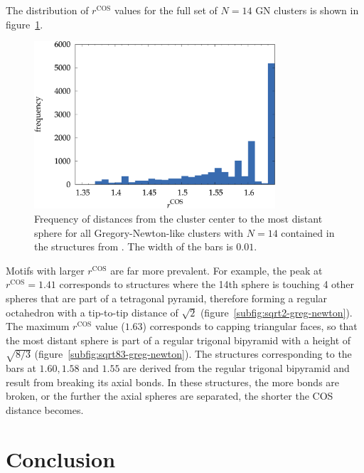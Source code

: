 The distribution of $r^\text{COS}$ values for the full set of $N=14$ \ac{GN}
clusters is shown in figure~\ref{fig:greg-newton}.
%
\begin{figure}
    \centering
    \includegraphics[width=0.8\textwidth]{gregory-newton/greg-newton.pdf}
    \caption{Frequency of distances from the cluster center to the most distant
    sphere for all Gregory-Newton-like clusters with $N=14$ contained in the
    structures from
    \citeauthor{Holmes-Cerfon_EnumeratingRigidSphere_2016}\autocite{Holmes-Cerfon_EnumeratingRigidSphere_2016}.
    The width of the bars is $0.01$.}
    \label{fig:greg-newton}
\end{figure}
%
Motifs with larger $r^\text{COS}$ are far more prevalent. For example, the peak
at $r^\text{COS} = 1.41$ corresponds to structures where the 14th sphere is
touching 4 other spheres that are part of a tetragonal pyramid, therefore
forming a regular octahedron with a tip-to-tip distance of $\sqrt{2}$
(figure~\ref{subfig:sqrt2-greg-newton}).  The maximum $r^\text{COS}$ value
($1.63$) corresponds to capping triangular faces, so that the most distant
sphere is part of a regular trigonal bipyramid with a height of $\sqrt{8/3}$
(figure~\ref{subfig:sqrt83-greg-newton}). The structures corresponding to the
bars at $1.60,1.58$ and $1.55$ are derived from the regular trigonal bipyramid
and result from breaking its axial bonds. In these structures, the more bonds
are broken, or the further the axial spheres are separated, the shorter the
\ac{COS} distance becomes.

\section{Conclusion}

